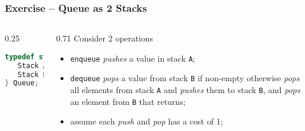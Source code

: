 \documentclass[aspectratio=169]{beamer}
\begin{document}
\begin{frame}[fragile]\frametitle{Exercise -- Queue as 2 Stacks}

\begin{columns}
\begin{column}{0.25\textwidth}
\begin{lstlisting}[language=C++,emph={Stack,Queue}]
typedef struct queue {
   Stack A;
   Stack B;
} Queue;
\end{lstlisting}
\end{column}
\begin{column}{0.71\textwidth}
Consider 2 operations
\begin{itemize}
    \item \texttt{enqueue} \emph{pushes} a value in stack \texttt{A};
    \item \texttt{dequeue} \emph{pops} a value from stack \texttt{B} if non-empty otherwise \emph{pops} all elements from stack \texttt{A} and \emph{pushes} them to stack \texttt{B}, and \emph{pops} an element from \texttt{B} that returns;
    \item assume each \emph{push} and \emph{pop} has a cost of 1;
  \end{itemize}
\end{column}
\end{columns}

~\\[-3mm]
~\\[-11mm]
~\\[-11mm]
\end{frame}

\end{document}
